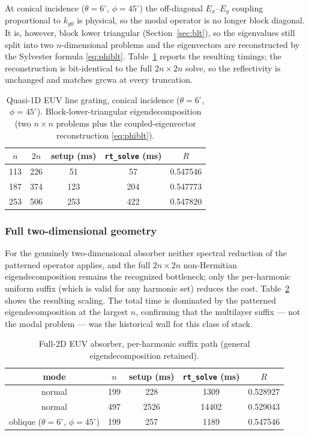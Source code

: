 \documentclass[11pt]{article}
\theoremstyle{remark}
\begin{document}
At conical incidence ($\theta=6^\circ$, $\phi=45^\circ$) the off-diagonal
$E_x$--$E_y$ coupling proportional to $k_{y0}$ is physical, so the modal
operator is no longer block diagonal.  It is, however, block lower triangular
(Section~\ref{sec:blt}), so the eigenvalues still split into two $n$-dimensional
problems and the eigenvectors are reconstructed by the Sylvester formula
\eqref{eq:phiblt}.  Table~\ref{tab:q1do} reports the resulting timings; the
reconstruction is bit-identical to the full $2n\times2n$ solve, so the
reflectivity is unchanged and matches grcwa at every truncation.

\begin{table}[t]
\centering
\caption{Quasi-1D EUV line grating, conical incidence ($\theta=6^\circ$,
$\phi=45^\circ$).  Block-lower-triangular eigendecomposition (two $n\times n$
problems plus the coupled-eigenvector reconstruction \eqref{eq:phiblt}).}
\label{tab:q1do}
\begin{tabular}{ccccc}
\toprule
$n$ & $2n$ & setup (ms) & \texttt{rt\_solve} (ms) & $R$\\
\midrule
113 & 226 & 51 & 57 & 0.547546\\
187 & 374 & 123 & 204 & 0.547773\\
253 & 506 & 253 & 422 & 0.547820\\
\bottomrule
\end{tabular}
\end{table}

\subsubsection{Full two-dimensional geometry}

For the genuinely two-dimensional absorber neither spectral reduction of the
patterned operator applies, and the full $2n\times2n$ non-Hermitian
eigendecomposition remains the recognized bottleneck; only the per-harmonic
uniform suffix (which is valid for any harmonic set) reduces the cost.
Table~\ref{tab:f2d} shows the resulting scaling.  The total time is dominated
by the patterned eigendecomposition at the largest $n$, confirming that the
multilayer suffix --- not the modal problem --- was the historical wall for
this class of stack.

\begin{table}[t]
\centering
\caption{Full-2D EUV absorber, per-harmonic suffix path (general eigendecomposition
retained).}
\label{tab:f2d}
\begin{tabular}{ccccc}
\toprule
mode & $n$ & setup (ms) & \texttt{rt\_solve} (ms) & $R$\\
\midrule
normal & 199 & 228 & 1309 & 0.528927\\
normal & 497 & 2526 & 14402 & 0.529043\\
oblique ($\theta=6^\circ$, $\phi=45^\circ$) & 199 & 257 & 1189 & 0.547546\\
\bottomrule
\end{tabular}
\end{table}
\end{document}

